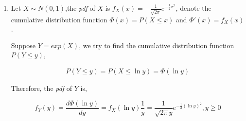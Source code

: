 \documentclass[a4paper]{article}
\begin{document}
\begin{enumerate}
\begin{enumerate}
\begin{proof}
      "$\Longleftarrow$": 

      Suppose $\EX[f(x)] \EX[g(y)] = \EX[f(x)g(y)]$, for all $A,B \in \mathbb{R}$
      Let $f(x)$ be the indicator random variable $f(x) = \mathbb{I}(x\in A)$, $g(y) = \mathbb{I}(y\in B)$
      \begin{equation}
        \begin{aligned}
          P(x\in A, y \in B) &= \EX[\mathbb{I}(x\in A)\mathbb{I}(y\in B)] = \EX[f(x)g(y)] \\
          & = \EX[f(x)]\EX[g(y)] = \EX[\mathbb{I}(x\in A)] \EX[\mathbb{I}(y\in B)] ] \\
          & = P(x\in A) P(y\in B)
        \end{aligned}
      \end{equation}

      So $P_{X,Y}(x,y) = P_X(x)P_Y(y)$ which means $X,Y$ are independent.
    \end{proof}
  \end{enumerate}

  \item Let $X\sim N(0,1)$,the \textit{pdf} of $X$ is $f_X(x) = -\frac {1}{\sqrt{2\pi}} e^{-\frac 1 2 x^2}$, denote the cumulative distribution function $\Phi(x) = P(X\leqslant x )$ and  $\Phi'(x) = f_X(x)$.
  
  Suppose $Y = exp(X)$, we try to find the cumulative distribution function $P(Y\leqslant y)$,

  \begin{equation}
    \begin{aligned}
      P(Y\leqslant y) = P(X\leqslant \ln y) = \Phi(\ln y)
    \end{aligned}
  \end{equation}

  Therefore, the \textit{pdf} of $Y$ is,

  \begin{equation}
    f_Y(y) = \frac {d \Phi(\ln y)}{ dy} = f_X(\ln y) \frac 1 y = \frac {1}{\sqrt{2\pi} y} e^{-\frac 1 2 (\ln y)^2}, y \geqslant 0
  \end{equation}

  \end{enumerate}
    
\end{document}
